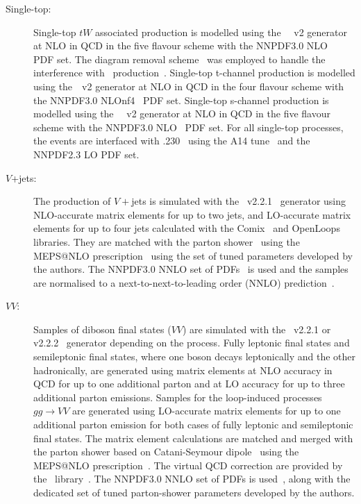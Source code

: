 \begin{description}
\item[Single-top:]  Single-top $tW$ associated production is modelled using the \powheg~\cite{Re:2010bp,Nason:2004rx,Frixione:2007vw,Alioli:2010xd}~v2 generator at NLO in QCD in the five flavour scheme with the NNPDF3.0 NLO~\cite{Ball:2014uwa} PDF set.
The diagram removal scheme~\cite{Frixione:2008yi} was employed to handle the interference with \ttbar\ production~\cite{ATL-PHYS-PUB-2016-020}.
Single-top t-channel production is modelled using the \powheg\,\cite{Frederix:2012dh,Nason:2004rx,Frixione:2007vw,Alioli:2010xd}~v2 generator at NLO in QCD in the four flavour scheme with the NNPDF3.0 NLOnf4~\cite{Ball:2014uwa} PDF set.
Single-top s-channel production is modelled using the \powheg~\cite{Alioli:2009je,Nason:2004rx,Frixione:2007vw,Alioli:2010xd}~v2 generator at NLO in QCD in the five flavour scheme with the NNPDF3.0 NLO~\cite{Ball:2014uwa} PDF set.
For all single-top processes, the events are interfaced with \pythiaeight.230~\cite{Sjostrand:2014zea} using the A14 tune~\cite{ATL-PHYS-PUB-2014-021} and the NNPDF2.3 LO PDF set.

\item[$V$+jets:] The production of $V+$jets is simulated with the \sherpa~v2.2.1~\cite{Bothmann:2019yzt}
generator using NLO-accurate matrix elements for up to two jets, and LO-accurate matrix elements
for up to four jets calculated with the Comix~\cite{Gleisberg:2008fv}
and OpenLoops~\cite{Cascioli:2011va,Denner:2016kdg} libraries. They
are matched with the \sherpa parton shower~\cite{Schumann:2007mg} using the MEPS@NLO
prescription~\cite{Hoeche:2011fd,Hoeche:2012yf,Catani:2001cc,Hoeche:2009rj}
using the set of tuned parameters developed by the \sherpa authors.
The NNPDF3.0 NNLO set of PDFs~\cite{Ball:2014uwa} is used and the samples
are normalised to a next-to-next-to-leading order (NNLO)
prediction~\cite{Anastasiou:2003ds}.

\item[$VV$:] Samples of diboson final states ($VV$) are simulated with the
\sherpa~v2.2.1 or v2.2.2~\cite{Bothmann:2019yzt} generator depending on the process.
Fully leptonic final states and semileptonic final states, where one boson
decays leptonically and the other hadronically, are generated using
matrix elements at NLO accuracy in QCD for up to one additional parton
and at LO accuracy for up to three additional parton
emissions. Samples for the loop-induced processes $gg \to VV$ are
generated using LO-accurate matrix elements for up to one
additional parton emission for both cases of fully leptonic and
semileptonic final states. The matrix element calculations are matched
and merged with the \sherpa parton shower based on Catani-Seymour
dipole~\cite{Gleisberg:2008fv,Schumann:2007mg} using the MEPS@NLO
prescription~\cite{Hoeche:2011fd,Hoeche:2012yf,Catani:2001cc,Hoeche:2009rj}.
The virtual QCD correction are provided by the
\openloops\ library~\cite{Cascioli:2011va,Denner:2016kdg}. The
NNPDF3.0 NNLO set of PDFs is used~\cite{Ball:2014uwa}, along with the
dedicated set of tuned parton-shower parameters developed by the
\sherpa authors.


\end{description}
